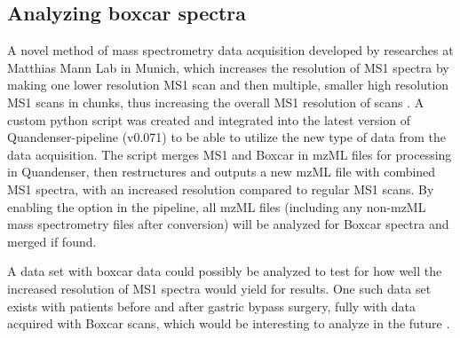 \subsection{Analyzing boxcar spectra}
A novel method of mass spectrometry data acquisition developed by researches at Matthias Mann Lab in Munich, which increases the resolution of MS1 spectra by making one lower resolution MS1 scan and then multiple, smaller high resolution MS1 scans in chunks, thus increasing the overall MS1 resolution of scans \cite{boxcar}. A custom python script was created and integrated into the latest version of Quandenser-pipeline (v0.071) to be able to utilize the new type of data from the data acquisition. The script merges MS1 and Boxcar in mzML files for processing in Quandenser, then restructures and outputs a new mzML file with combined MS1 spectra, with an increased resolution compared to regular MS1 scans. By enabling the option in the pipeline, all mzML files (including any non-mzML mass spectrometry files after conversion) will be analyzed for Boxcar spectra and merged if found.

A data set with boxcar data could possibly be analyzed to test for how well the increased resolution of MS1 spectra would yield for results. One such data set exists with patients before and after gastric bypass surgery, fully with data acquired with Boxcar scans, which would be interesting to analyze in the future \cite{boxcar-data}.
